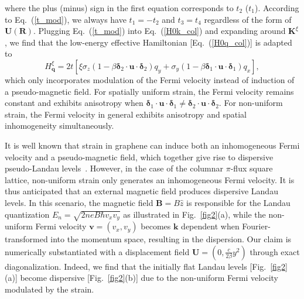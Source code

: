 \documentclass[aps, twocolumn, floatfix, superscriptaddress, prb]{revtex4-1}
\begin{document}
%
where the plus (minus) sign in the first equation corresponds to $t_2$ ($t_1$). According to Eq.~(\ref{t_mod}), we always have $t_1= -t_2$ and $t_3= t_4$ regardless of the form of ${\bm U}({\bm R})$. Plugging Eq.~(\ref{t_mod}) into Eq.~(\ref{H0k_col}) and expanding around $\bm K^\xi$, we find that the low-energy effective Hamiltonian [Eq.~(\ref{H0q_col})] is adapted to
%
\begin{equation}
{
H_{\bm q}^\xi=2t[\xi\sigma_z (1-\beta\bm{\delta}_2\cdot\bm{u}\cdot\bm{\delta}_2)q_y +\sigma_y (1-\beta\bm{\delta}_1\cdot\bm{u}\cdot\bm{\delta}_1)q_x],
}
\end{equation}
%
{which only incorporates modulation of the Fermi velocity instead of induction of a pseudo-magnetic field. For spatially uniform strain, the Fermi velocity remains constant and exhibits anisotropy when $\bm{\delta}_1\cdot\bm{u}\cdot\bm{\delta}_1 \neq \bm{\delta}_2\cdot\bm{u}\cdot\bm{\delta}_2$. For non-uniform strain, the Fermi velocity in general exhibits anisotropy and spatial inhomogeneity simultaneously.}



It is well known that strain in graphene can induce both an inhomogeneous Fermi velocity and a pseudo-magnetic field, which together give rise to dispersive pseudo-Landau levels~\cite{liu2022, lantagne2020}. However, in the case of the columnar $\pi$-flux square lattice, non-uniform strain only generates an inhomogeneous Fermi velocity. It is thus anticipated that an external magnetic field produces dispersive Landau levels. {In this scenario, the magnetic field $\bm B=B\hat z$ is responsible for the Landau quantization $E_n=\sqrt{2neB\hbar v_xv_y}$ as illustrated in Fig.~\ref{fig2}(a), while the non-uniform Fermi velocity $\bm v=(v_x,v_y)$ becomes $\bm k$ dependent when Fourier-transformed into the momentum space, resulting in the dispersion. Our claim is numerically substantiated with a displacement field ${\bm U}=(0,\frac{c}{2\beta}y^2)$ through exact diagonalization. Indeed, we find that the initially flat Landau levels [Fig.~\ref{fig2}(a)] become dispersive [Fig.~\ref{fig2}(b)] due to the non-uniform Fermi velocity modulated by the strain.}
\end{document}
